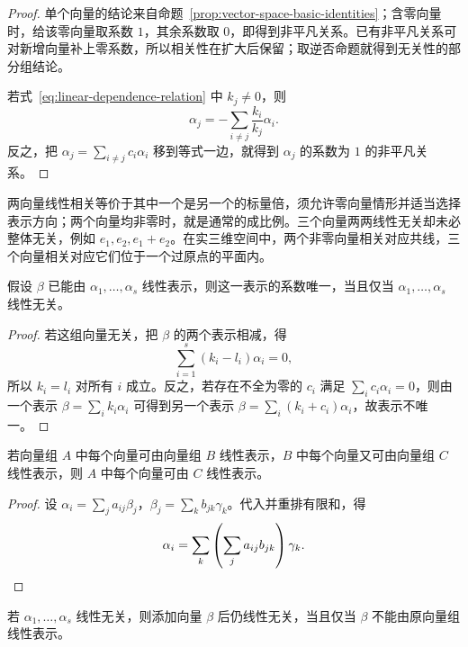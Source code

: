 \begin{proof}
单个向量的结论来自命题~\ref{prop:vector-space-basic-identities}；含零向量时，给该零向量取系数 $1$，其余系数取 $0$，即得到非平凡关系。已有非平凡关系可对新增向量补上零系数，所以相关性在扩大后保留；取逆否命题就得到无关性的部分组结论。

若式~\eqref{eq:linear-dependence-relation} 中 $k_j\ne0$，则
\[
    \alpha_j=-\sum_{i\ne j}\frac{k_i}{k_j}\alpha_i.
\]
反之，把 $\alpha_j=\sum_{i\ne j}c_i\alpha_i$ 移到等式一边，就得到 $\alpha_j$ 的系数为 $1$ 的非平凡关系。
\end{proof}

两向量线性相关等价于其中一个是另一个的标量倍，须允许零向量情形并适当选择表示方向；两个向量均非零时，就是通常的成比例。三个向量两两线性无关却未必整体无关，例如 $e_1,e_2,e_1+e_2$。在实三维空间中，两个非零向量相关对应共线，三个向量相关对应它们位于一个过原点的平面内。

\begin{theorem}
\label{thm:unique-linear-representation}
假设 $\beta$ 已能由 $\alpha_1,\ldots,\alpha_s$ 线性表示，则这一表示的系数唯一，当且仅当 $\alpha_1,\ldots,\alpha_s$ 线性无关。
\end{theorem}

\begin{proof}
若这组向量无关，把 $\beta$ 的两个表示相减，得
\[
    \sum_{i=1}^s(k_i-l_i)\alpha_i=0,
\]
所以 $k_i=l_i$ 对所有 $i$ 成立。反之，若存在不全为零的 $c_i$ 满足 $\sum_i c_i\alpha_i=0$，则由一个表示 $\beta=\sum_i k_i\alpha_i$ 可得到另一个表示 $\beta=\sum_i(k_i+c_i)\alpha_i$，故表示不唯一。
\end{proof}

\begin{proposition}
\label{prop:representation-transitive}
若向量组 $A$ 中每个向量可由向量组 $B$ 线性表示，$B$ 中每个向量又可由向量组 $C$ 线性表示，则 $A$ 中每个向量可由 $C$ 线性表示。
\end{proposition}

\begin{proof}
设 $\alpha_i=\sum_j a_{ij}\beta_j$，$\beta_j=\sum_k b_{jk}\gamma_k$。代入并重排有限和，得
\[
    \alpha_i=\sum_k\left(\sum_j a_{ij}b_{jk}\right)\gamma_k.\qedhere
\]
\end{proof}

\begin{corollary}
\label{cor:adjoin-vector-independence}
若 $\alpha_1,\ldots,\alpha_s$ 线性无关，则添加向量 $\beta$ 后仍线性无关，当且仅当 $\beta$ 不能由原向量组线性表示。
\end{corollary}

